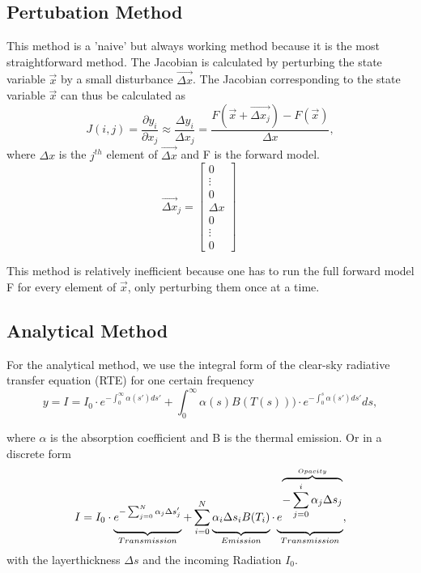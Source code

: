 \subsection*{Pertubation Method}
This method is a 'naive' but always working method because it is the most
straightforward method. The Jacobian is calculated by perturbing the state
variable $\vec{x}$ by a small disturbance $\vec{\Delta x}$. The Jacobian
corresponding to the state variable $\vec{x}$ can thus be calculated as
\begin{equation}
J(i,j)=\frac{\partial y_i}{\partial x_j} \approx \frac{\Delta y_i}{\Delta x_j} =
\frac{F(\vec{x}+\vec{\Delta x_j})-F(\vec{x})}{\Delta x},
\end{equation}
where $\Delta x$ is the $j^{th}$ element of $\vec{\Delta x} $ and F is the
forward model.
{
	\begin{equation*}
	\vec{\Delta x}_j=\left[\begin{array}{c} 0 \\ \vdots \\0\\ \Delta x \\ 0\\ \vdots
	\\0\end{array}\right] \qquad
	\end{equation*}
}

This method is relatively inefficient because one has to run the full forward
model F for every element of $\vec{x}$, only perturbing them once at a time.

\subsection*{Analytical Method}
For the analytical method, we use the integral form of the clear-sky radiative
transfer equation (RTE) for one certain frequency
\begin{equation*}
y=I=I_0 \cdot e^{-\int_0^\infty \alpha(s') ds'}+ \int_0^\infty \alpha(s)B(T(s)))
\cdot e^{-\int_0^s \alpha(s')ds'} ds,
\end{equation*}

where $\alpha$ is the absorption coefficient and B is the thermal emission. Or
in a discrete form
\begin{equation*}
I=I_0 \cdot \underbrace{\vphantom{\frac{a}{b}}e^{-\sum_{j=0}^N \alpha_j \Delta
		s_j'}}_{\substack{Transmission}}+ \sum_{i=0}^N
\underbrace{\vphantom{\frac{a}{b}}\alpha_i \Delta s_i
	B(T_i)}_{\substack{Emission}} \cdot
\underbrace{\vphantom{\frac{a}{b}}e^{\overbrace{-\sum_{j=0}^i \alpha_j \Delta
			s_j}^{Opacity}}}_{\substack{Transmission}},
\end{equation*}
with the layerthickness $\Delta s$ and the incoming Radiation $I_0$.\\

